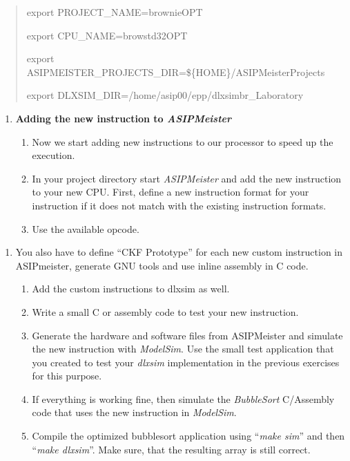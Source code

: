 \documentclass[
]{article}
\begin{document}
\begin{quote}
export PROJECT\_NAME=brownieOPT

export CPU\_NAME=browstd32OPT

export ASIPMEISTER\_PROJECTS\_DIR=\$\{HOME\}/ASIPMeisterProjects

export DLXSIM\_DIR=/home/asip00/epp/dlxsimbr\_Laboratory
\end{quote}

\begin{enumerate}
\def\labelenumi{\arabic{enumi}.}
\setcounter{enumi}{4}
\item
  \textbf{Adding the new instruction to \emph{ASIPMeister}}

  \begin{enumerate}
  \def\labelenumii{\arabic{enumii}.}
  \item
    Now we start adding new instructions to our processor to speed up
    the execution.
  \item
    In your project directory start \emph{ASIPMeister} and add the new
    instruction to your new CPU. First, define a new instruction format
    for your instruction if it does not match with the existing
    instruction formats.
  \item
    Use the available opcode.
  \end{enumerate}
\end{enumerate}

\begin{enumerate}
\def\labelenumi{\arabic{enumi}.}
\item
  You also have to define ``CKF Prototype'' for each new custom
  instruction in ASIPmeister, generate GNU tools and use inline assembly
  in C code.

  \begin{enumerate}
  \def\labelenumii{\arabic{enumii}.}
  \item
    Add the custom instructions to dlxsim as well.
  \item
    Write a small C or assembly code to test your new instruction.
  \item
    Generate the hardware and software files from ASIPMeister and
    simulate the new instruction with \emph{ModelSim}. Use the small
    test application that you created to test your \emph{dlxsim}
    implementation in the previous exercises for this purpose.
  \item
    If everything is working fine, then simulate the \emph{BubbleSort}
    C/Assembly code that uses the new instruction in \emph{ModelSim}.
  \item
    Compile the optimized bubblesort application using ``\emph{make
    sim}'' and then ``\emph{make dlxsim}''. Make sure, that the
    resulting array is still correct.
  \end{enumerate}
\end{enumerate}
\end{document}
